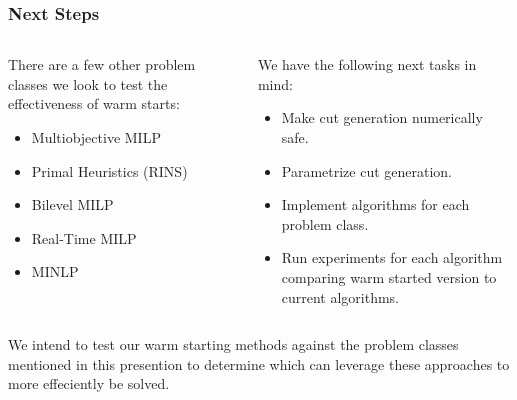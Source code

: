 \documentclass{beamer}
\begin{document}
	\begin{frame}[t]
		\frametitle{Next Steps}
		\small
		\begin{columns}[T]
			\begin{column}{0.45\textwidth}
				There are a few other problem classes we look to test the effectiveness of warm starts:
				\begin{itemize}
					\item Multiobjective MILP
					\item Primal Heuristics (RINS)
					\item Bilevel MILP
					\item Real-Time MILP
					\item MINLP
				\end{itemize}
			\end{column}
			\begin{column}{0.45\textwidth}
				We have the following next tasks in mind:
				\begin{itemize}
					\item Make cut generation numerically safe.
					\item Parametrize cut generation.
					\item Implement algorithms for each problem class.
					\item Run experiments for each algorithm comparing warm started version to current algorithms.
				\end{itemize}
			\end{column}
		\end{columns}
		\begin{block}{}
			We intend to test our warm starting methods against the problem classes mentioned in this presention to determine which can leverage these approaches to more effeciently be solved.
		\end{block}
		\normalsize
	\end{frame}
\end{document}
